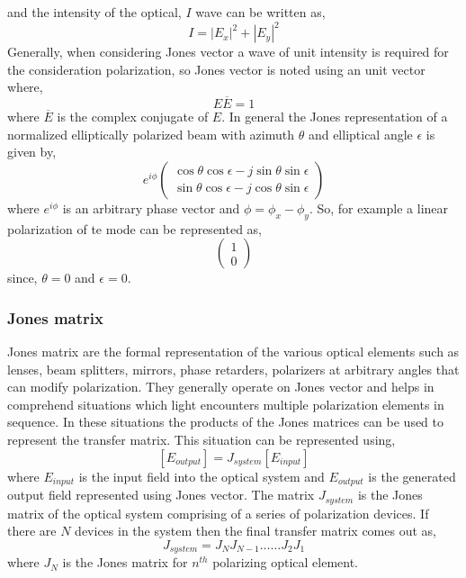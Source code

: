 \documentclass[../report.tex]{subfiles}
\begin{document}
and the intensity of the optical, $I$ wave can be written as,
\begin{equation}\label{eq:jones_vector_intensity}
I = \left| E_x\right| ^{2}+\left| E_y\right| ^{2} 
\end{equation}
Generally, when considering Jones vector a wave of unit intensity is required for the consideration polarization, so Jones vector is noted using an unit vector where,
\begin{equation}\label{eq:jones_unit_vector_form}
	E\overline {E} = 1
\end{equation}
where $\overline {E}$ is the complex conjugate of $E$. 
In general the Jones representation of a normalized elliptically polarized beam with azimuth $\theta$ and elliptical angle $\epsilon$ is given by,
\begin{equation}\label{eq:jones_vector_general_form}
e^{i\phi}\left(\begin{matrix} 
\cos\theta\cos\epsilon - j\sin\theta\sin\epsilon\\
\sin\theta\cos\epsilon - j\cos\theta\sin\epsilon 
\end{matrix} \right) 
\end{equation}
where $e^{i\phi}$ is an arbitrary phase vector and $\phi = \phi_x - \phi_y$. So, for example a linear polarization of \gls{te} mode can be represented as,
\begin{equation}\label{eq:jones_vector_linear_pol}
\left(\begin{matrix}  
1 \\
0
\end{matrix} \right) 
\end{equation}
since, $\theta=0$ and $\epsilon = 0$.
			
			\subsubsection{Jones matrix}
Jones matrix are the formal representation of the various optical elements such as lenses, beam splitters, mirrors, phase retarders, polarizers at arbitrary angles that can modify polarization. They generally operate on Jones vector and helps in comprehend situations which light encounters multiple polarization elements in sequence. In these situations the products of the Jones matrices can be used to represent the transfer matrix. This situation can be represented using,
\begin{equation}\label{eq:jones_matrix}
[E_{output}] = J_{system}[E_{input}] 
\end{equation}
where $E_{input}$ is the input field into the optical system and $E_{output}$ is the generated output field represented using Jones vector. The matrix $J_{system}$ is the Jones matrix of the optical system comprising of a series of polarization devices. If there are $N$ devices in the system then the final transfer matrix comes out as,
\begin{equation}\label{eq:jones_transfer_matrix}
J_{system} =J_{N}J_{N-1}\ldots \ldots J_{2}J_{1} 
\end{equation}   
where $J_{N}$ is the Jones matrix for $n^{th}$ polarizing optical element.
\end{document}
